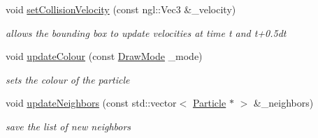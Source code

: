 \begin{DoxyCompactItemize}
void \hyperlink{classParticle_aaaecbd96e5c316275c3d208a45fc6c14}{setCollisionVelocity} (const ngl::Vec3 \&\_\-velocity)
\begin{DoxyCompactList}\small\item\em allows the bounding box to update velocities at time t and t+0.5dt \item\end{DoxyCompactList}\item 
void \hyperlink{classParticle_a5035778e0aa62ed6bc2d7f0ae45f723b}{updateColour} (const \hyperlink{Common_8h_a9a325db332d24e6105fe3b48a94604c3}{DrawMode} \_\-mode)
\begin{DoxyCompactList}\small\item\em sets the colour of the particle \item\end{DoxyCompactList}\item 
void \hyperlink{classParticle_a50dd1d5f58c0147fa3eba021adaf2752}{updateNeighbors} (const std::vector$<$ \hyperlink{classParticle}{Particle} $\ast$ $>$ \&\_\-neighbors)
\begin{DoxyCompactList}\small\item\em save the list of new neighbors \item\end{DoxyCompactList}\end{DoxyCompactItemize}
